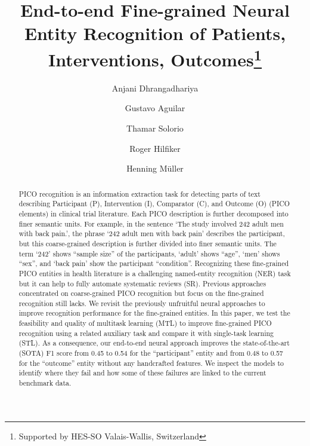 \documentclass[runningheads]{llncs}
\begin{document}
%
\title{End-to-end Fine-grained Neural Entity Recognition of Patients, Interventions, Outcomes\thanks{Supported by HES-SO Valais-Wallis, Switzerland}} 
%
%
\author{Anjani Dhrangadhariya \and
Gustavo Aguilar \and
Thamar Solorio
\and 
Roger Hilfiker
\and 
Henning Müller}
%
%
%
\maketitle              %
%
\begin{abstract}
PICO recognition is an information extraction task for detecting parts of text describing Participant (P), Intervention (I), Comparator (C), and Outcome (O) (PICO elements) in clinical trial literature.
Each PICO description is further decomposed into finer semantic units.
For example, in the sentence `The study involved 242 adult men with back pain.', the phrase `242 adult men with back pain' describes the participant, but this coarse-grained description is further divided into finer semantic units.
The term `242' shows ``sample size'' of the participants, `adult' shows ``age'', `men' shows ``sex'', and `back pain' show the participant ``condition''.
Recognizing these fine-grained PICO entities in health literature is a challenging named-entity recognition (NER) task but it can help to fully automate systematic reviews (SR).
Previous approaches concentrated on coarse-grained PICO recognition but focus on the fine-grained recognition still lacks.
We revisit the previously unfruitful neural approaches to improve recognition performance for the fine-grained entities.
In this paper, we test the feasibility and quality of multitask learning (MTL) to improve fine-grained PICO recognition using a related auxiliary task and compare it with single-task learning (STL).
As a consequence, our end-to-end neural approach improves the state-of-the-art (SOTA) F1 score from 0.45 to 0.54 for the ``participant'' entity and from 0.48 to 0.57 for the ``outcome'' entity without any handcrafted features.
We inspect the models to identify where they fail and how some of these failures are linked to the current benchmark data.
%
\end{abstract}
%
\end{document}
